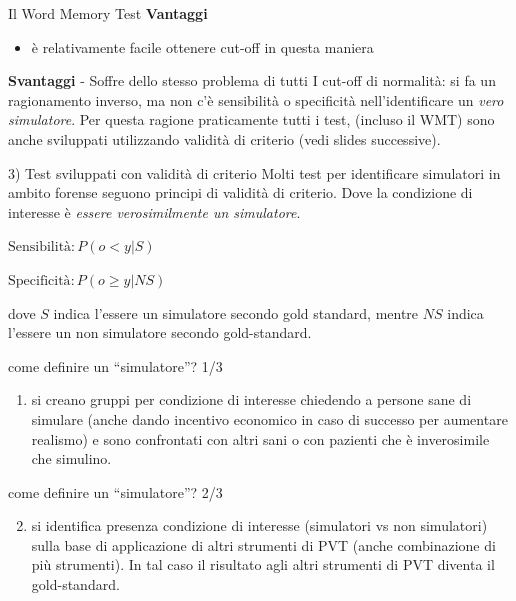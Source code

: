 \documentclass[
  ignorenonframetext,
]{beamer}
\providecommand{\tightlist}{%
  \setlength{\itemsep}{0pt}\setlength{\parskip}{0pt}}
\begin{document}
\begin{frame}{Il Word Memory Test}
\label{il-word-memory-test-1}
\textbf{Vantaggi}

\begin{itemize}
\tightlist
\item
  è relativamente facile ottenere cut-off in questa maniera
\end{itemize}

\textbf{Svantaggi} - Soffre dello stesso problema di tutti I cut-off di
normalità: si fa un ragionamento inverso, ma non c'è sensibilità o
specificità nell'identificare un \emph{vero simulatore}. Per questa
ragione praticamente tutti i test, (incluso il WMT) sono anche
sviluppati utilizzando validità di criterio (vedi slides successive).
\end{frame}

\begin{frame}{3) Test sviluppati con validità di criterio}
\label{test-sviluppati-con-validituxe0-di-criterio}
Molti test per identificare simulatori in ambito forense seguono
principi di validità di criterio. Dove la condizione di interesse è
\emph{essere verosimilmente un simulatore}.

\(\text{Sensibilità}: P(o < y | S)\)

\(\text{Specificità}: P(o \geq  y | NS)\)

dove \(S\) indica l'essere un simulatore secondo gold standard, mentre
\(NS\) indica l'essere un non simulatore secondo gold-standard.
\end{frame}

\begin{frame}{come definire un ``simulatore''? 1/3}
\label{come-definire-un-simulatore-13}
\small

\begin{enumerate}
\tightlist
\item
  si creano gruppi per condizione di interesse chiedendo a persone sane
  di simulare (anche dando incentivo economico in caso di successo per
  aumentare realismo) e sono confrontati con altri sani o con pazienti
  che è inverosimile che simulino.
\end{enumerate}
\end{frame}

\begin{frame}{come definire un ``simulatore''? 2/3}
\label{come-definire-un-simulatore-23}
\begin{enumerate}
\setcounter{enumi}{1}
\tightlist
\item
  si identifica presenza condizione di interesse (simulatori vs non
  simulatori) sulla base di applicazione di altri strumenti di PVT
  (anche combinazione di più strumenti). In tal caso il risultato agli
  altri strumenti di PVT diventa il gold-standard.
\end{enumerate}
\end{frame}
\end{document}
